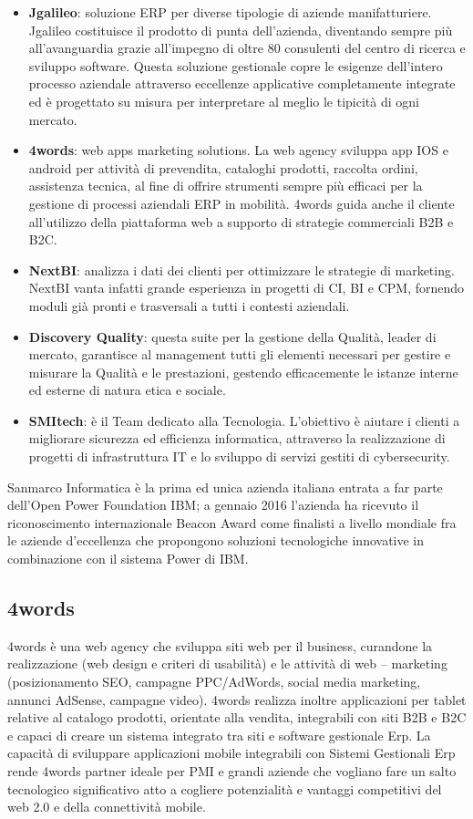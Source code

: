 \begin{itemize}
	\item \textbf{Jgalileo}: soluzione \Gls{ERP} per diverse tipologie di aziende manifatturiere. Jgalileo costituisce il prodotto di punta dell'azienda, diventando sempre più all'avanguardia grazie all'impegno di oltre 80 consulenti del centro di ricerca e sviluppo software. Questa soluzione gestionale copre le esigenze dell'intero processo aziendale attraverso eccellenze applicative completamente integrate ed è progettato su misura per interpretare al meglio le tipicità di ogni mercato.	
	\item \textbf{4words}: web apps marketing solutions. La web agency sviluppa app \gls{IOS} e \Gls{android} per attività di prevendita, cataloghi prodotti, raccolta ordini, assistenza tecnica, al fine di offrire strumenti sempre più efficaci per la gestione di processi aziendali ERP in mobilità. 4words guida anche il cliente all'utilizzo della piattaforma web a supporto di strategie commerciali \Gls{B2B} e \Gls{B2C}.
	\item \textbf{NextBI}: analizza i dati dei clienti per ottimizzare le strategie di marketing. NextBI vanta infatti grande esperienza in progetti di \gls{CI}, \Gls{BI} e \Gls{CPM}, fornendo moduli già pronti e trasversali a tutti i contesti aziendali.
	\item \textbf{Discovery Quality}: questa suite per la gestione della Qualità, leader di mercato, garantisce al management tutti gli elementi necessari per gestire e misurare la Qualità e le prestazioni, gestendo efficacemente le istanze interne ed esterne di natura etica e sociale.
	\item \textbf{SMItech}: è il Team dedicato alla Tecnologia. L'obiettivo è aiutare i clienti a migliorare sicurezza ed efficienza informatica, attraverso la realizzazione di progetti di infrastruttura IT e lo sviluppo di servizi gestiti di \Gls{cybersecurity}.
\end{itemize}
Sanmarco Informatica è la prima ed unica azienda italiana entrata a far parte dell'\Gls{Open Power Foundation IBM}; a gennaio 2016 l'azienda ha ricevuto il riconoscimento internazionale \Gls{Beacon Award} come finalisti a livello mondiale fra le aziende d'eccellenza che propongono soluzioni tecnologiche innovative in combinazione con il sistema \Gls{Power} di IBM.

\subsection{4words}
4words è una web agency che sviluppa siti web per il business, curandone la realizzazione (web design e criteri di usabilità) e le attività di web – marketing (posizionamento \Gls{SEO}, campagne \Gls{PPC}/AdWords, social media marketing, annunci AdSense, campagne video).
4words realizza inoltre applicazioni per tablet relative al catalogo prodotti, orientate alla vendita, integrabili con siti B2B e B2C e capaci di creare un sistema integrato tra siti e software gestionale Erp.
La capacità di sviluppare applicazioni mobile integrabili con Sistemi Gestionali Erp rende 4words partner ideale per \Gls{PMI} e grandi aziende che vogliano fare un salto tecnologico significativo atto a cogliere potenzialità e vantaggi competitivi del web 2.0 e della connettività mobile.
